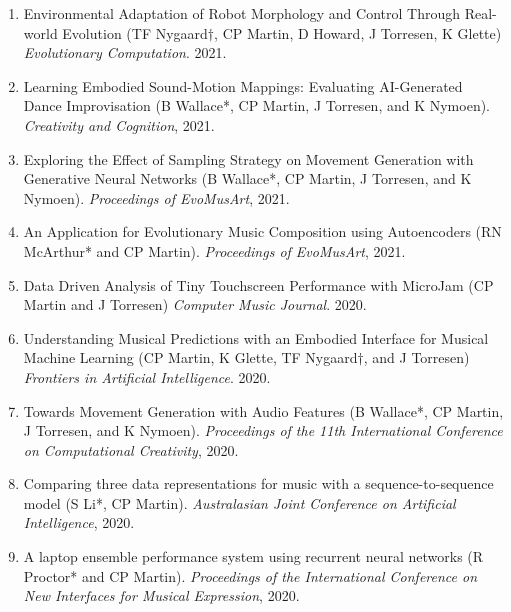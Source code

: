 \documentclass[11pt, a4paper, oneside]{article}
\begin{document}
\begin{enumerate}
\item Environmental Adaptation of Robot Morphology and Control Through
  Real-world Evolution (TF Nygaard$\dagger$, CP Martin, D Howard, J
  Torresen, K Glette) \emph{Evolutionary Computation}.
  2021.  


\item Learning Embodied Sound-Motion Mappings: Evaluating AI-Generated Dance
	Improvisation (B Wallace*, CP Martin, J Torresen, and K Nymoen).
	\emph{Creativity and Cognition}, 2021. 

\item Exploring the Effect of Sampling Strategy on Movement Generation
  with Generative Neural Networks (B Wallace*, CP Martin, J
  Torresen, and K Nymoen). \emph{Proceedings of EvoMusArt}, 2021.

\item An Application for Evolutionary Music Composition using
  Autoencoders (RN McArthur* and CP Martin). \emph{Proceedings of
    EvoMusArt}, 2021. 


\item Data Driven Analysis of Tiny Touchscreen Performance with
  MicroJam (CP Martin and J Torresen) \emph{Computer Music
    Journal}. 2020. 

\item Understanding Musical Predictions with an Embodied Interface for
  Musical Machine Learning (CP Martin, K Glette, TF Nygaard$\dagger$, and J
  Torresen) \emph{Frontiers in Artificial Intelligence}. 2020.

\item Towards Movement Generation with Audio Features (B Wallace*, CP Martin, J Torresen, and K Nymoen). \emph{Proceedings of the
    11th International Conference on Computational Creativity}, 2020.

\item Comparing three data representations for music with a
  sequence-to-sequence model (S Li*, CP Martin). \emph{Australasian
    Joint Conference on Artificial Intelligence}, 2020.

\item A laptop ensemble performance system using recurrent neural
  networks (R Proctor* and CP Martin). \emph{Proceedings of the
    International Conference on New Interfaces for Musical
Expression}, 2020. 


\end{enumerate}
\end{document}
